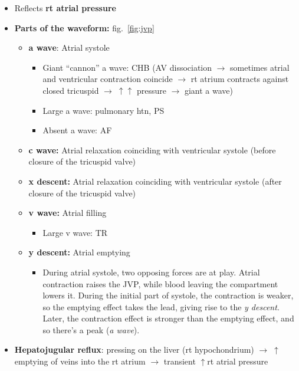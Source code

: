 \documentclass[
  12pt,
]{memoir}
\providecommand{\tightlist}{%
  \setlength{\itemsep}{0pt}\setlength{\parskip}{0pt}}
\begin{document}
\begin{itemize}
\tightlist
\item
  Reflects \textbf{rt atrial pressure}
\item
  \textbf{Parts of the waveform:} fig.~\ref{fig:jvp}

  \begin{itemize}
  \tightlist
  \item
    \textbf{a wave}: Atrial systole

    \begin{itemize}
    \tightlist
    \item
      Giant ``cannon'' a wave: CHB (AV dissociation \(\rightarrow\)
      sometimes atrial and ventricular contraction coincide
      \(\rightarrow\) rt atrium contracts against closed tricuspid
      \(\rightarrow\;\uparrow\uparrow\) pressure \(\rightarrow\) giant a
      wave)
    \item
      Large a wave: pulmonary htn, PS
    \item
      Absent a wave: AF
    \end{itemize}
  \item
    \textbf{c wave:} Atrial relaxation coinciding with ventricular
    systole (before closure of the tricuspid valve)
  \item
    \textbf{x descent:} Atrial relaxation coinciding with ventricular
    systole (after closure of the tricuspid valve)
  \item
    \textbf{v wave:} Atrial filling

    \begin{itemize}
    \tightlist
    \item
      Large v wave: TR
    \end{itemize}
  \item
    \textbf{y descent:} Atrial emptying

    \begin{itemize}
    \tightlist
    \item
      During atrial systole, two opposing forces are at play. Atrial
      contraction raises the JVP, while blood leaving the compartment
      lowers it. During the initial part of systole, the contraction is
      weaker, so the emptying effect takes the lead, giving rise to the
      \emph{y descent}. Later, the contraction effect is stronger than
      the emptying effect, and so there's a peak (\emph{a wave}).
    \end{itemize}
  \end{itemize}
\item
  \textbf{Hepatojugular reflux}: pressing on the liver (rt
  hypochondrium) \(\rightarrow\;\uparrow\)emptying of veins into the rt
  atrium \(\rightarrow\) transient \(\uparrow\)rt atrial pressure


\end{itemize}
\end{document}
